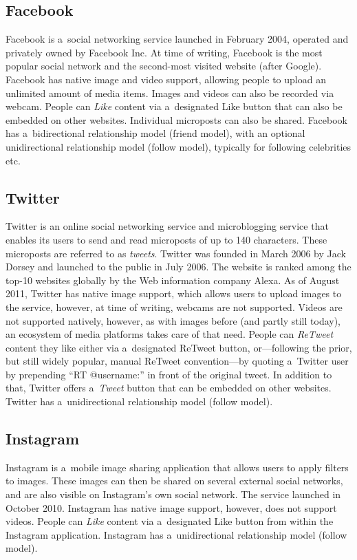 \subsection{Facebook}
Facebook is a~social networking service launched in February 2004,
operated and privately owned by Facebook Inc.
At time of writing, Facebook is the most popular social network
and the second-most visited website (after Google).
Facebook has native image and video support,
allowing people to upload an unlimited amount of media items.
Images and videos can also be recorded via webcam.
People can \emph{Like} content via a~designated Like button
that can also be embedded on other websites.
Individual microposts can also be shared.
Facebook has a~bidirectional relationship model (friend model),
with an optional unidirectional relationship model (follow model),
typically for following celebrities etc.

\subsection{Twitter}
Twitter is an online social networking service and microblogging service
that enables its users to send and read microposts of up to 140 characters.
These microposts are referred to as \emph{tweets}.
Twitter was founded in March 2006 by Jack Dorsey and launched to the public in July 2006.
The website is ranked among the top-10 websites globally by the Web information company Alexa.
As of August 2011, Twitter has native image support,
which allows users to upload images to the service, however, at time of writing,
webcams are not supported.
Videos are not supported natively, however, as with images before (and partly still today),
an ecosystem of media platforms takes care of that need.
People can \emph{ReTweet} content they like either via a~designated ReTweet button,
or---following the prior, but still widely popular, manual ReTweet convention---by
quoting a~Twitter user by prepending ``RT @username:'' in front of the original tweet.
In addition to that, Twitter offers a~\emph{Tweet} button that can be embedded on other websites.
Twitter has a~unidirectional relationship model (follow model).

\subsection{Instagram}
Instagram is a~mobile image sharing application that allows users to apply filters to images.
These images can then be shared on several external social networks,
and are also visible on Instagram's own social network.
The service launched in October 2010.
Instagram has native image support, however, does not support videos.
People can \emph{Like} content via a~designated Like button
from within the Instagram application.
Instagram has a~unidirectional relationship model (follow model).

